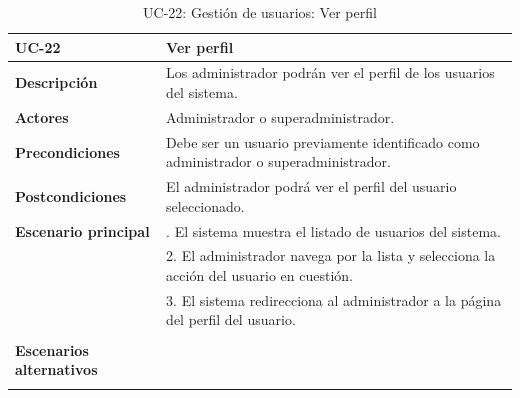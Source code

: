 \begin{table}[H]
  \begin{center}
    \begin{tabularx}{16.4cm}{|l|X|}
      \hline
      \textbf{UC-22} & \textbf{Ver perfil}\\
      \hline
      \textbf{Descripción} & Los administrador podrán ver el perfil de los usuarios del sistema.\\
      \hline
      \textbf{Actores} & Administrador o superadministrador.\\
      \hline
      \textbf{Precondiciones} & Debe ser un usuario previamente identificado como administrador o superadministrador.\\
      \hline
      \textbf{Postcondiciones} & El administrador podrá ver el perfil del usuario seleccionado.\\
      \hline
      \textbf{Escenario principal} & \smallskip 1. El sistema muestra el listado de usuarios del sistema.\\
      & 2. El administrador navega por la lista y selecciona la acción del usuario en cuestión.\\
      & 3. El sistema redirecciona al administrador a la página del perfil del usuario.\\
      & \\
      \hline
      \textbf{Escenarios alternativos} & \\
      & \\
      \hline
    \end{tabularx}
    \caption{UC-22: Gestión de usuarios: Ver perfil}
    \label{tab:CU-ver-perfil-admin}
  \end{center}
\end{table}


